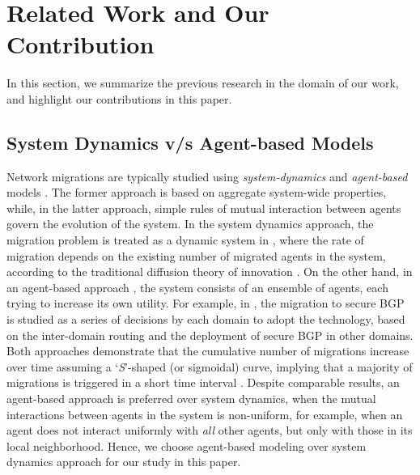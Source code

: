 \documentclass[smallextended]{svjour3}
\begin{document}
\section{Related Work and Our Contribution} \label{sec:rw}
In this section, we summarize the previous research in the domain of
our work, and highlight our contributions in this paper.

\subsection{System Dynamics v/s Agent-based Models}
Network migrations are typically studied using \emph{system-dynamics}
\cite{Jin08, Sen10} and \emph{agent-based} models \cite{Macy02, Bonabeau02}.
The former approach is based on aggregate system-wide properties, while, in the
latter approach, simple rules of mutual interaction between agents govern the
evolution of the system. In the system dynamics approach, the migration problem
is treated as a dynamic system in \cite{Jin08, Sen10}, where the rate of
migration depends on the existing number of migrated agents in the system,
according to the traditional diffusion theory of innovation \cite{Bass69}. On
the other hand, in an agent-based approach \cite{Macy02, Bonabeau02}, the system
consists of an ensemble of agents, each trying to increase its own utility.
For example, in \cite{Gill11}, the migration to secure BGP is studied as a
series of decisions by each domain to adopt the technology, based
on the inter-domain routing and the deployment of secure BGP in other domains.
Both approaches demonstrate that the cumulative number of migrations increase
over time assuming a `\emph{S}'-shaped (or sigmoidal) curve, implying that a
majority of migrations is triggered in a short time interval \cite{Borshchev04}.
Despite comparable results, an agent-based approach is preferred over system
dynamics, when the mutual interactions between agents in the system is
non-uniform, for example, when an agent does not interact uniformly with
\emph{all} other agents, but only with those in its local neighborhood. Hence,
we choose agent-based modeling over system dynamics approach for our study in
this paper.
\end{document}
